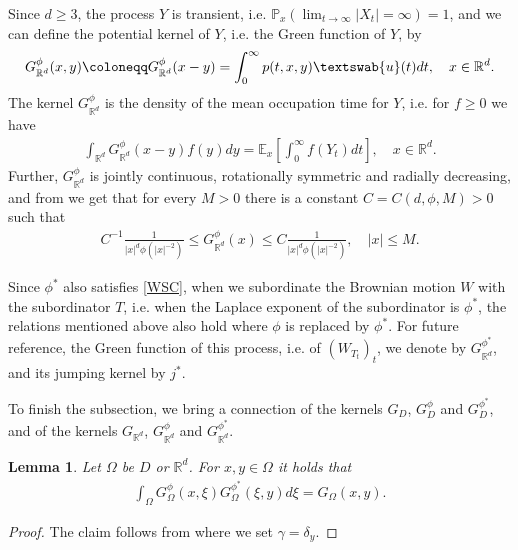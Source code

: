 \documentclass[12pt,a4paper,onecolumn]{amsart}
\newtheorem{lem}[thm]{Lemma}
\theoremstyle{definition}
\newcommand{\R}{\mathbb{R}}
\newcommand{\p}{\mathbb{P}}
\newcommand{\1}{\mathbf 1}
\newcommand{\GDfi}{G^\phi_{ D}}
\newcommand{\GDFI}{\GDfi}
\newcommand{\GDfz}{G^{\phi^*}_{ D}}
\newcommand{\GD}{G_{ D}}
\newcommand{\uu}{\textswab{u}}
\numberwithin{equation}{section}
\begin{document}
Since $d\ge 3$, the process $Y$ is transient, i.e. $\p_x(\lim_{t\to\infty}|X_t|=\infty)=1$, and we can define the potential kernel of $Y$, i.e. the Green function of $Y$, by
	\begin{align*}
		G^{\phi}_{\R^d}(x,y)\coloneqq G^{\phi}_{\R^d}(x-y)=\int_{0}^\infty p(t,x,y)\uu(t)dt, \quad x\in \R^d.
	\end{align*}
	The kernel $G^{\phi}_{\R^d}$ is the density of the mean occupation time for $Y$, i.e. for $f\ge0$ we have
	\begin{align*}
		\int_{\R^d}G^{\phi}_{\R^d}(x-y)f(y)dy=\mathbb{E}_x\left[\int_{0}^{\infty}f(Y_t)dt\right],\quad x\in\R^d.
	\end{align*}
	Further, $G^{\phi}_{\R^d}$ is jointly continuous, rotationally symmetric and radially decreasing, and from \cite[Lemma 3.2(b)]{KSV_global_UBHP} we get that for every $M>0$ there is a constant $C=C(d,\phi,M)>0$ such that 
	\begin{align*}
		C^{-1} \frac{1}{|x|^d\phi(|x|^{-2})}\le G^{\phi}_{\R^d}(x) \le	C \frac{1}{|x|^d\phi(|x|^{-2})},\quad |x|\le M.
	\end{align*}
 
Since $\phi^*$ also satisfies \ref{WSC}, when we subordinate the Brownian motion $W$ with the subordinator $T$, i.e. when the Laplace exponent of the subordinator is $\phi^*$, the relations mentioned above also hold where $\phi$ is replaced by $\phi^*$. For future reference, the Green function of this process, i.e. of $(W_{T_t})_t$, we denote by $G^{\phi^*}_{\R^d}$, and its jumping kernel by $j^*$.

To finish the subsection, we bring a connection of the kernels $\GD$, $\GDFI$ and $\GDfz$, and of the kernels $G_{\R^d}$, $G^{\phi}_{\R^d}$ and $G^{\phi^*}_{\R^d}$.
\begin{lem}\label{l: GDf(GDf*)=GD}
	Let $\Omega$ be $D$ or $\R^d$. For $x,y\in \Omega$ it holds that
	\begin{align}\label{eq: GDf(GDf*)=GD}
		\int_\Omega G^{\phi}_{\Omega}(x,\xi)G^{\phi^*}_{\Omega}(\xi,y)d\xi=G_{\Omega}(x,y).
	\end{align}
\end{lem}
\begin{proof}
	The claim follows from \cite[Proposition 14.2(ii)]{bernstein} where we set $\gamma=\delta_y$.
\end{proof}
\end{document}
